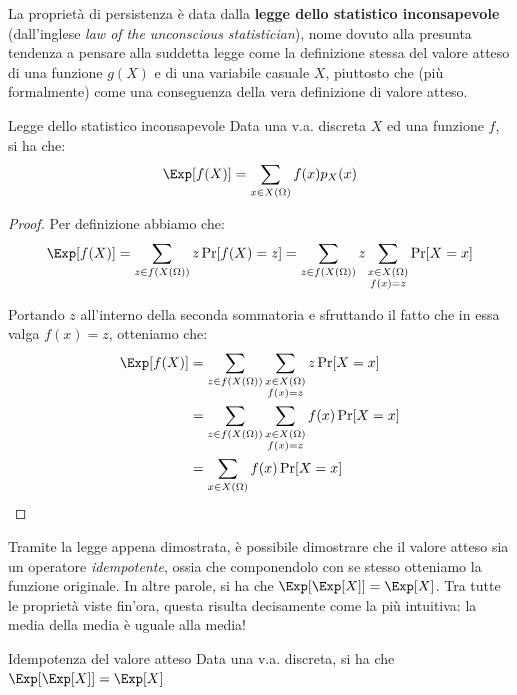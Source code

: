 \documentclass[a4paper, 12pt]{report}
\begin{document}
    La proprietà di persistenza è data dalla \textbf{legge dello statistico inconsapevole} (dall'inglese \textit{law of the unconscious statistician}), nome dovuto alla presunta tendenza a pensare alla suddetta legge come la definizione stessa del valore atteso di una funzione $g(X)$ e di una variabile casuale $X$, piuttosto che (più formalmente) come una conseguenza della vera definizione di valore atteso.

    \begin{framedthm}[label={inc_stat}]{Legge dello statistico inconsapevole}
        Data una v.a. discreta $X$ ed una funzione $f$, si ha che:
        \[\Exp[f(X)] = \sum_{x \in X(\Omega)} f(x) p_X(x)\]
    \end{framedthm}

    \begin{proof}
        Per definizione abbiamo che:
        \[\Exp[f(X)] = \sum_{z \in f(X(\Omega))} z \Pr[f(X) = z] = \sum_{z \in f(X(\Omega))} z \sum_{\substack{x \in X(\Omega) \\ f(x) = z}} \Pr[X = x]\]

        Portando $z$ all'interno della seconda sommatoria e sfruttando il fatto che in essa valga $f(x) = z$, otteniamo che:
        \[\begin{split}
            \Exp[f(X)] &= \sum_{z \in f(X(\Omega))} \sum_{\substack{x \in X(\Omega) \\ f(x) = z}} z \Pr[X = x] \\
            &= \sum_{z \in f(X(\Omega))} \sum_{\substack{x \in X(\Omega) \\ f(x) = z}} f(x) \Pr[X = x] \\
            &= \sum_{x \in X(\Omega)} f(x) \Pr[X = x] \\
        \end{split}\]
    \end{proof}

    Tramite la legge appena dimostrata, è possibile dimostrare che il valore atteso sia un operatore \textit{idempotente}, ossia che componendolo con se stesso otteniamo la funzione originale. In altre parole, si ha che $\Exp[\Exp[X]] = \Exp[X]$. Tra tutte le proprietà viste fin'ora, questa risulta decisamente come la più intuitiva: la media della media è uguale alla media!

    \begin{framedprop}{Idempotenza del valore atteso}
        Data una v.a. discreta, si ha che $\Exp[\Exp[X]] = \Exp[X]$
    \end{framedprop}
\end{document}

